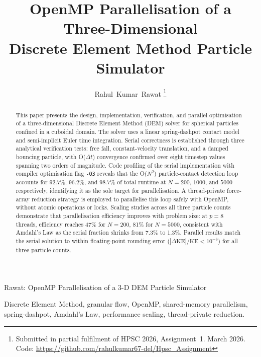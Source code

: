 \documentclass[journal]{IEEEtran}
\begin{document}
\title{OpenMP Parallelisation of a Three-Dimensional\\
       Discrete Element Method Particle Simulator}

\author{Rahul~Kumar~Rawat%
\thanks{Submitted in partial fulfilment of HPSC 2026, Assignment~1.
        March 2026.
        Code: \url{https://github.com/rahulkumar67-del/Hpsc_Assignment}}}

%
{Rawat: OpenMP Parallelisation of a 3-D DEM Particle Simulator}

\maketitle

\begin{abstract}
This paper presents the design, implementation, verification, and
parallel optimisation of a three-dimensional Discrete Element Method
(DEM) solver for spherical particles confined in a cuboidal domain.
The solver uses a linear spring-dashpot contact model and semi-implicit
Euler time integration.  Serial correctness is established through
three analytical verification tests: free fall, constant-velocity
translation, and a damped bouncing particle, with O($\Delta t$)
convergence confirmed over eight timestep values spanning two orders of
magnitude.  Code profiling of the serial implementation with compiler
optimisation flag \texttt{-O3} reveals that the O($N^{2}$)
particle-contact detection loop accounts for 92.7\%, 96.2\%, and
98.7\% of total runtime at $N=200$, $1000$, and $5000$ respectively,
identifying it as the sole target for parallelisation.  A
thread-private force-array reduction strategy is employed to
parallelise this loop safely with OpenMP, without atomic operations or
locks.  Scaling studies across all three particle counts demonstrate
that parallelisation efficiency improves with problem size: at $p=8$
threads, efficiency reaches 47\% for $N=200$, 81\% for $N=5000$,
consistent with Amdahl's Law as the serial fraction shrinks from 7.3\%
to 1.3\%.  Parallel results match the serial solution to within
floating-point rounding error ($|\Delta\mathrm{KE}|/\mathrm{KE} <
10^{-8}$) for all three particle counts.
\end{abstract}

\begin{IEEEkeywords}
Discrete Element Method, granular flow, OpenMP, shared-memory
parallelism, spring-dashpot, Amdahl's Law, performance scaling,
thread-private reduction.
\end{IEEEkeywords}
\end{document}
